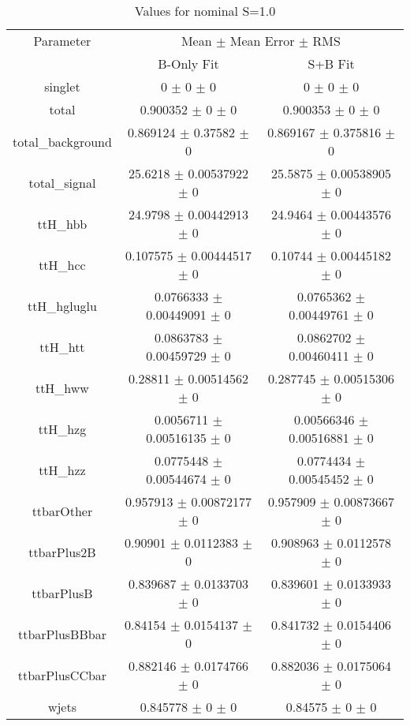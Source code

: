 \begin{table}
\centering
\caption{Values for nominal S=1.0}
\begin{tabular}{ccc}
\toprule
Parameter & \multicolumn{2}{c}{Mean $\pm$ Mean Error $\pm$ RMS}\\
 & B-Only Fit & S+B Fit\\
\midrule
singlet & \num{0} $\pm$ \num{0} $\pm$ \num{0} & \num{0} $\pm$ \num{0} $\pm$ \num{0}\\
total & \num{0.900352} $\pm$ \num{0} $\pm$ \num{0} & \num{0.900353} $\pm$ \num{0} $\pm$ \num{0}\\
total\_background & \num{0.869124} $\pm$ \num{0.37582} $\pm$ \num{0} & \num{0.869167} $\pm$ \num{0.375816} $\pm$ \num{0}\\
total\_signal & \num{25.6218} $\pm$ \num{0.00537922} $\pm$ \num{0} & \num{25.5875} $\pm$ \num{0.00538905} $\pm$ \num{0}\\
ttH\_hbb & \num{24.9798} $\pm$ \num{0.00442913} $\pm$ \num{0} & \num{24.9464} $\pm$ \num{0.00443576} $\pm$ \num{0}\\
ttH\_hcc & \num{0.107575} $\pm$ \num{0.00444517} $\pm$ \num{0} & \num{0.10744} $\pm$ \num{0.00445182} $\pm$ \num{0}\\
ttH\_hgluglu & \num{0.0766333} $\pm$ \num{0.00449091} $\pm$ \num{0} & \num{0.0765362} $\pm$ \num{0.00449761} $\pm$ \num{0}\\
ttH\_htt & \num{0.0863783} $\pm$ \num{0.00459729} $\pm$ \num{0} & \num{0.0862702} $\pm$ \num{0.00460411} $\pm$ \num{0}\\
ttH\_hww & \num{0.28811} $\pm$ \num{0.00514562} $\pm$ \num{0} & \num{0.287745} $\pm$ \num{0.00515306} $\pm$ \num{0}\\
ttH\_hzg & \num{0.0056711} $\pm$ \num{0.00516135} $\pm$ \num{0} & \num{0.00566346} $\pm$ \num{0.00516881} $\pm$ \num{0}\\
ttH\_hzz & \num{0.0775448} $\pm$ \num{0.00544674} $\pm$ \num{0} & \num{0.0774434} $\pm$ \num{0.00545452} $\pm$ \num{0}\\
ttbarOther & \num{0.957913} $\pm$ \num{0.00872177} $\pm$ \num{0} & \num{0.957909} $\pm$ \num{0.00873667} $\pm$ \num{0}\\
ttbarPlus2B & \num{0.90901} $\pm$ \num{0.0112383} $\pm$ \num{0} & \num{0.908963} $\pm$ \num{0.0112578} $\pm$ \num{0}\\
ttbarPlusB & \num{0.839687} $\pm$ \num{0.0133703} $\pm$ \num{0} & \num{0.839601} $\pm$ \num{0.0133933} $\pm$ \num{0}\\
ttbarPlusBBbar & \num{0.84154} $\pm$ \num{0.0154137} $\pm$ \num{0} & \num{0.841732} $\pm$ \num{0.0154406} $\pm$ \num{0}\\
ttbarPlusCCbar & \num{0.882146} $\pm$ \num{0.0174766} $\pm$ \num{0} & \num{0.882036} $\pm$ \num{0.0175064} $\pm$ \num{0}\\
wjets & \num{0.845778} $\pm$ \num{0} $\pm$ \num{0} & \num{0.84575} $\pm$ \num{0} $\pm$ \num{0}\\
\bottomrule
\end{tabular}
\end{table}